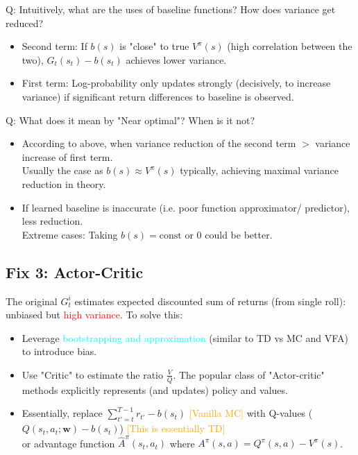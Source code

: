 \documentclass{article}
\begin{document}
\begin{hintbox}
    Q: Intuitively, what are the uses of baseline functions? How does variance get reduced?
    \begin{prfbox}
        \begin{itemize}
        \item Second term: If $b(s)$ is "close" to true $V^{\pi}(s)$ (high correlation between the two), 
            $G_t(s_t) - b(s_t)$ achieves lower variance.
        \item First term: Log-probability only updates strongly (decisively, to increase variance) if significant return differences to baseline is observed.
        \end{itemize}
    \end{prfbox}
    Q: What does it mean by "Near optimal"? When is it not?
    \begin{prfbox}
        \begin{itemize}
        \item According to above, when variance reduction of the second term $>$ variance increase of first term.
            \\Usually the case as $b(s) \approx V^{\pi}(s)$ typically, achieving maximal variance reduction in theory.
        \item If learned baseline is inaccurate (i.e. poor function approximator/ predictor), less reduction.
            \\Extreme cases: Taking $b(s) = \text{const}$ or 0 could be better.
        \end{itemize}
    \end{prfbox}
\end{hintbox}

\subsection{Fix 3: Actor-Critic}
The original $G_{t}^{i}$ estimates expected discounted sum of returns (from single roll): unbiased but \textcolor{red}{high variance}.
To solve this:
\begin{itemize}
\item Leverage \textcolor{cyan}{bootstrapping and approximation} (similar to TD vs MC and VFA) to introduce bias.
\item Use "Critic" to estimate the ratio $\frac{V}{Q}$. The popular class of "Actor-critic" methods explicitly represents (and updates) policy and values.
\item Essentially, replace $\sum_{t' = t}^{T-1} r_{t'} - b(s_t)$ \textcolor{orange}{[Vanilla MC]} 
    with Q-values ($Q(s_t, a_t; \mathbf{w}) - b(s_t)$) \textcolor{orange}{[This is essentially TD]} 
    \\or advantage function $\hat{A}^{\pi}(s_t, a_t)$ where $A^{\pi}(s, a) = Q^{\pi}(s, a) - V^{\pi}(s)$.
\end{itemize}
\end{document}
